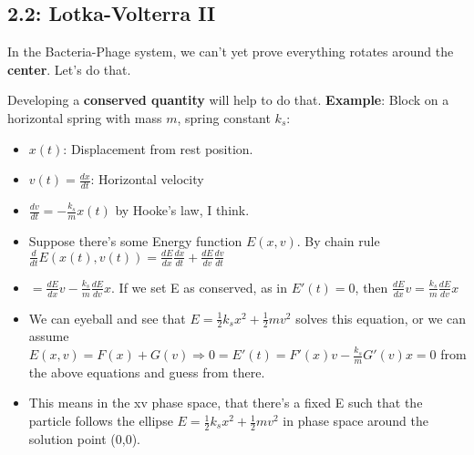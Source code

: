 \documentclass[11pt, oneside]{article}   	%
\begin{document}
\subsection{2.2: Lotka-Volterra II}

In the Bacteria-Phage system, we can't yet prove everything rotates around the \textbf{center}.  Let's do that.

Developing a \textbf{conserved quantity} will help to do that.  \textbf{Example}: Block on a horizontal spring with mass $m$, spring constant $k_s$:
\begin{itemize}
\item $x(t)$: Displacement from rest position.
\item $v(t) = \frac{dx}{dt}$: Horizontal velocity
\item $\frac{dv}{dt} = -\frac{k_s}{m}x(t)$ by Hooke's law, I think.
\item Suppose there's some Energy function $E(x,v)$.  By chain rule $\frac{d}{dt}E(x(t), v(t)) = \frac{dE}{dx}\frac{dx}{dt} +  \frac{dE}{dv}\frac{dv}{dt}$
\item $=  \frac{dE}{dx}v - \frac{k_s}{m} \frac{dE}{dv}x$.  If we set E as conserved, as in $E'(t) = 0$, then $\frac{dE}{dx}v = \frac{k_s}{m} \frac{dE}{dv}x$
\item We can eyeball and see that $E = \frac{1}{2}k_sx^2 +  \frac{1}{2}mv^2$ solves this equation, or we can assume $E(x,v) = F(x) + G(v) \Rightarrow 0 = E'(t) = F'(x)v - \frac{k_s}{m}G'(v)x = 0$ from the above equations and guess from there.
\item This means in the xv phase space, that there's a fixed E such that the particle follows the ellipse $E = \frac{1}{2}k_sx^2 +  \frac{1}{2}mv^2$ in phase space around the solution point (0,0).
\end{itemize}
\end{document}
